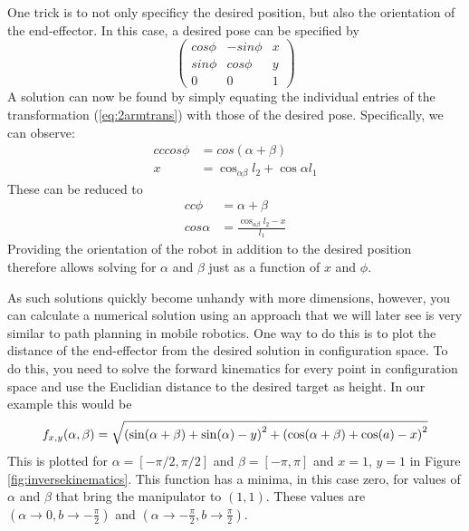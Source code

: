 One trick is to not only specificy the desired position, but also the orientation of the end-effector. In this case, a desired pose can be specified by
\begin{equation}
\left(
\begin{array}{ccc}
cos\phi & -sin\phi & x\\
sin\phi & cos\phi & y\\
0 & 0 & 1
\end{array}
\right)
\end{equation}
A solution can now be found by simply equating the individual entries of the transformation (\ref{eq:2armtrans}) with those of the desired pose. Specifically, we can observe:
\begin{eqnarray}{cc}
cos\phi &= cos(\alpha+\beta)\\
x &= \cos_{\alpha\beta}l_2+\cos\alpha l_1
\end{eqnarray}
These can be reduced to
\begin{eqnarray}{cc}
\phi &= \alpha + \beta\\
cos\alpha &= \frac{\cos_{\alpha\beta}l_2-x}{l_1}
\end{eqnarray}
Providing the orientation of the robot in addition to the desired position therefore allows solving for $\alpha$ and $\beta$ just as a function of $x$ and $\phi$.  

As such solutions quickly become unhandy with more dimensions, however, you can calculate a numerical solution using an approach that we will later see is very similar to path planning in mobile robotics. One way to do this is to plot the distance of the end-effector from the desired solution in configuration space. To do this, you need to solve the forward kinematics for every point in configuration space and use the Euclidian distance to the desired target as height. In our example this would be
\begin{equation}
\small
f_{x,y}(\alpha,\beta)=\sqrt{\left(\sin(\alpha + \beta) + \sin(\alpha) - y\right)^2 + \left(\cos(\alpha+\beta)+\cos(a) - x\right)^2}
\end{equation}
This is plotted for $\alpha=[-\pi/2,\pi/2]$ and $\beta=[-\pi,\pi]$ and $x=1$, $y=1$ in Figure \ref{fig:inversekinematics}. This function has a minima, in this case zero, for values of $\alpha$ and $\beta$ that bring the manipulator to $(1,1)$. These values are $(\alpha \rightarrow 0, b \rightarrow -\frac{\pi}{2})$ and $(\alpha \rightarrow -\frac{\pi}{2}, b \rightarrow \frac{\pi}{2})$.


